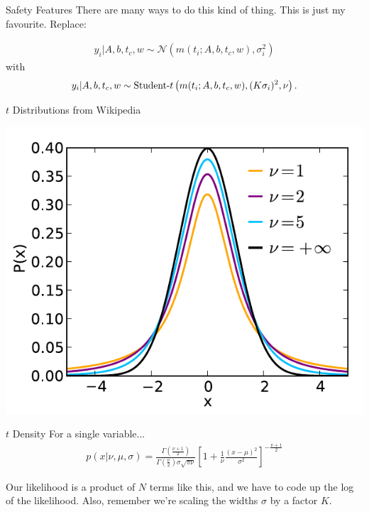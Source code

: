 \begin{frame}[t]{Safety Features}
There are many ways to do this kind of thing. This is just my favourite.
Replace:

\begin{eqnarray*}
y_i | A, b, t_c, w \sim \mathcal{N}\left(m(t_i; A, b, t_c, w), \sigma_i^2\right)
\end{eqnarray*}
with
\begin{eqnarray*}
y_i | A, b, t_c, w \sim \textnormal{Student-}t\left(m(t_i; A, b, t_c, w), (K\sigma_i)^2, \nu\right).
\end{eqnarray*}

\end{frame}

\begin{frame}[t]{$t$ Distributions from Wikipedia}
\begin{center}
\includegraphics[scale=0.7]{t.pdf}
\end{center}
\end{frame}

\begin{frame}[t]{$t$ Density}
For a single variable...
\begin{eqnarray*}
p(x|\nu, \mu, \sigma) = \frac{\Gamma\left(\frac{\nu + 1}{2}\right)}
{\Gamma\left(\frac{\nu}{2}\right)\sigma\sqrt{\pi\nu}}
\left[1 + \frac{1}{\nu}\frac{(x - \mu)^2}{\sigma^2}
\right]^{-\frac{\nu + 1}{2}}
\end{eqnarray*}

Our likelihood is a product of $N$ terms like this, and we have to code up the log
of the likelihood. Also, remember we're scaling the widths $\sigma$ by a factor $K$.

\end{frame}

